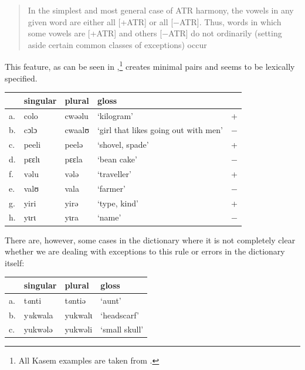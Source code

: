 \begin{quotation}
In the simplest and most general case of ATR harmony, the vowels in any given word are either all [+ATR] or all [−ATR]. Thus, words in which some vowels are [+ATR] and others [−ATR] do not ordinarily (setting aside certain common classes of exceptions) occur \autocite[496]{Casali.2008}
\end{quotation}

This feature, as can be seen in ,\footnote{All Kasem examples are taken from \textcite{Niggli.2016}.} creates minimal pairs and seems to be lexically specified.

\begin{exe}
    \ex \label{atr}
    \begin{tabular}[t]{lllll}
      & singular & plural & gloss                                &   \\
      \midrule
      a. & colo     & cwəəlu & `kilogram'                           & + \\
      b. & cɔlɔ     & cwaalʊ & `girl that likes going out with men' & $-$ \\
      c. & peeli    & peelə  & `shovel, spade'                      & + \\
      d. & pɛɛlɩ    & pɛɛla  & `bean cake'                          & $-$ \\
      f. & vəlu     & vələ   & `traveller'                          & + \\
      e. & valʊ     & vala   & `farmer'                             & $-$ \\
      g. & yiri     & yirə   & `type, kind'                         & + \\
      h. & yɩrɩ     & yɩra   & `name'                               & $-$ \\
    \end{tabular}
\end{exe}

There are, however, some cases in the dictionary where it is not completely clear whether we are dealing with exceptions to this rule or errors in the dictionary itself:

\begin{exe}
    \ex \label{atr-errors}
    \begin{tabular}[t]{llll}
      & singular         & plural          & gloss         \\
      \midrule
      a. & t\textit{a}nti   & t\textit{a}ntiə & `aunt'        \\
      b. & y\textit{u}kwala & yukwalɩ         & `headscarf'   \\
      c. & yukwələ          & yukwəli         & `small skull' \\
    \end{tabular}
\end{exe}

